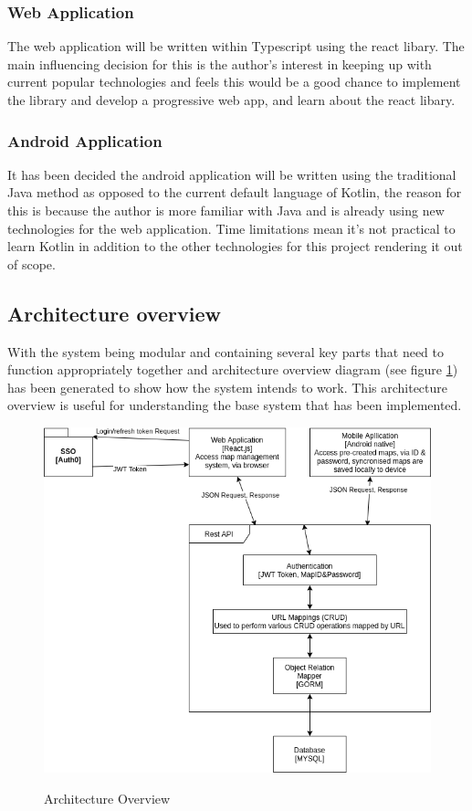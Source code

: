 \subsubsection{Web Application}
The web application will be written within Typescript using the react libary. The main influencing decision for this is the author's interest in keeping up with current popular technologies and feels this would be a good chance to implement the library and develop a progressive web app, and learn about the react libary.

\subsubsection{Android Application}
It has been decided the android application will be written using the traditional Java method as opposed to the current default language of Kotlin, the reason for this is because the author is more familiar with Java and is already using new technologies for the web application. Time limitations mean it's not practical to learn Kotlin in addition to the other technologies for this project rendering it out of scope.

\pagebreak
\subsection{Architecture overview}
With the system being modular and containing several key parts that need to function appropriately together and architecture overview diagram (see figure \ref{fig:architectureov}) has been generated to show how the system intends to work. This architecture overview is useful for understanding the base system that has been implemented.
\begin{figure}[h]
	\includegraphics[width=\linewidth]{./images/designs/ArchitectureOverview.png}\\
	\caption{Architecture Overview}
	\label{fig:architectureov}
\end{figure}

